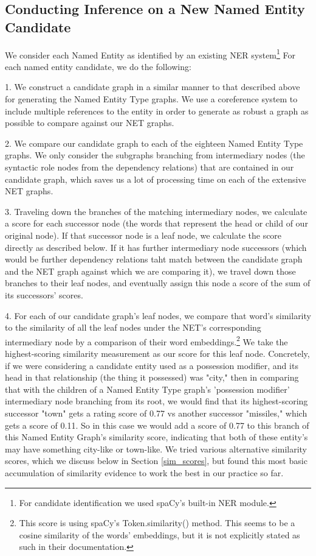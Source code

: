 \documentclass[11pt,a4paper]{article}
\begin{document}
\subsection{Conducting Inference on a New Named Entity Candidate}

We consider each Named Entity as identified by an existing NER system\footnote{For candidate identification we used spaCy's built-in NER module.} For each named entity candidate, we do the following:

1. We construct a candidate graph in a similar manner to that described above for generating the Named Entity Type graphs. We use a coreference system to include multiple references to the entity in order to generate as robust a graph as possible to compare against our NET graphs.

2. We compare our candidate graph to each of the eighteen Named Entity Type graphs. We only consider the subgraphs branching from intermediary nodes (the syntactic role nodes from the dependency relations) that are contained in our candidate graph, which saves us a lot of processing time on each of the extensive NET graphs.

3. Traveling down the branches of the matching intermediary nodes, we calculate a score for each successor node (the words that represent the head or child of our original node). If that successor node is a leaf node, we calculate the score directly as described below. If it has further intermediary node successors (which would be further dependency relations taht match between the candidate graph and the NET graph against which we are comparing it), we travel down those branches to their leaf nodes, and eventually assign this node a score of the sum of its successors' scores.

4. For each of our candidate graph's leaf nodes, we compare that word's similarity to the similarity of all the leaf nodes under the NET's corresponding intermediary node by a comparison of their word embeddings.\footnote{This score is using spaCy's Token.similarity() method. This seems to be a cosine similarity of the words' embeddings, but it is not explicitly stated as such in their documentation.} We take the highest-scoring similarity measurement as our score for this leaf node. Concretely, if we were considering a candidate entity used as a possession modifier, and its head in that relationship (the thing it possessed) was "city," then in comparing that with the children of a Named Entity Type graph's 'possession modifier' intermediary node branching from its root, we would find that its highest-scoring successor "town" gets a rating score of 0.77 vs another successor "missiles," which gets a score of 0.11. So in this case we would add a score of 0.77 to this branch of this Named Entity Graph's similarity score, indicating that both of these entity's may have something city-like or town-like. We tried various alternative similarity scores, which we discuss below in Section \ref{sim_scores}, but found this most basic accumulation of similarity evidence to work the best in our practice so far. 
\end{document}
